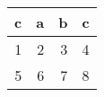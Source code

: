 \begin{tabular}{rrrr}
\hline
   c &   a &   b &   c \\
\hline
   1 &   2 &   3 &   4 \\
   5 &   6 &   7 &   8 \\
\hline
\end{tabular}